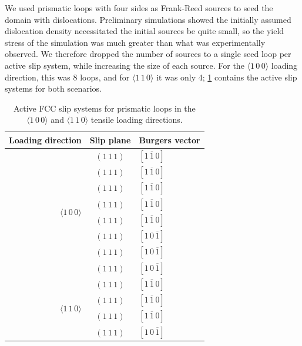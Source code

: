 We used prismatic loops with four sides as Frank-Reed sources to seed the domain with dislocations. Preliminary simulations showed the initially assumed dislocation density necessitated the initial sources be quite small, so the yield stress of the simulation was much greater than what was experimentally observed. We therefore dropped the number of sources to a single seed loop per active slip system, while increasing the size of each source. For the $\langle 1\, 0\, 0 \rangle$ loading direction, this was 8 loops, and for $\langle 1\, 1\, 0 \rangle$ it was only 4; \cref{t:slipSystems} contains the active slip systems for both scenarios.
\begin{table}
    \centering
    \caption{Active FCC slip systems for prismatic loops in the $\langle 1\, 0\, 0 \rangle$ and $\langle 1\, 1\, 0 \rangle$ tensile loading directions.}
    \label{t:slipSystems}
    \begin{tabular}{rcl}
        \toprule
        Loading direction                            & Slip plane    & Burgers vector           \\
        \midrule
        \multirow{8}{*}{$\langle 1\, 0\, 0 \rangle$} & $(1\, 1\, 1)$ & $[1\, \overline{1}\, 0]$ \\
                                                     & $(1\, 1\, 1)$ & $[1\, \overline{1}\, 0]$ \\
                                                     & $(1\, 1\, 1)$ & $[1\, \overline{1}\, 0]$ \\
                                                     & $(1\, 1\, 1)$ & $[1\, \overline{1}\, 0]$ \\
                                                     & $(1\, 1\, 1)$ & $[1\, \overline{1}\, 0]$ \\
                                                     & $(1\, 1\, 1)$ & $[1\, 0\, \overline{1}]$ \\
                                                     & $(1\, 1\, 1)$ & $[1\, 0\, \overline{1}]$ \\
                                                     & $(1\, 1\, 1)$ & $[1\, 0\, \overline{1}]$ \\
        \midrule
        \multirow{4}{*}{$\langle 1\, 1\, 0 \rangle$} & $(1\, 1\, 1)$ & $[1\, \overline{1}\, 0]$ \\
                                                     & $(1\, 1\, 1)$ & $[1\, \overline{1}\, 0]$ \\
                                                     & $(1\, 1\, 1)$ & $[1\, \overline{1}\, 0]$ \\
                                                     & $(1\, 1\, 1)$ & $[1\, 0\, \overline{1}]$ \\
        \bottomrule
    \end{tabular}
\end{table}
